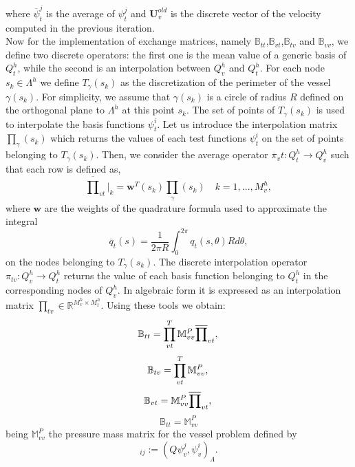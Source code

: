 \documentclass[a4paper]{report}
\begin{document}
where $\overline{\psi}^j_t$ is the average of $\psi^j_t$ and $\mathbf{U}_v^{old}$ is the discrete vector of the velocity computed in the previous iteration.\\
Now for the implementation of exchange matrices, namely $\mathbb{B}_{tt}$,$\mathbb{B}_{vt}$,$\mathbb{B}_{tv}$ and $\mathbb{B}_{vv}$, we define two discrete operators: the first one is the mean value of a generic basis of $Q_t^h$, while the second is an interpolation between $Q_v^h $ and $Q_t^h$. For each node $s_k \in \Lambda^h$  we define $T_\gamma(s_k)$ as the discretization of the perimeter of the vessel $\gamma(s_k)$. For simplicity, we assume that  $\gamma(s_k)$ is a circle of radius $R$ defined on the orthogonal plane to $\Lambda^h$ at this point $s_k$. The set of points of $T_{\gamma}(s_k)$ is used to interpolate the basis functions $\psi^i_t$. Let us introduce the interpolation matrix $\prod_{\gamma}(s_k)$ which returns the values of each test functions $\psi^i_t$ on the set of points belonging to $T_{\gamma}(s_k)$. Then, we consider the average operator $\overline{\pi}_vt: Q^h_t \rightarrow Q^h_v$ such that each row is defined as,
\begin{equation}
\overline{\prod}_{vt}|_k = \mathbf{w}^T(s_k) \prod_{\gamma}(s_k) \quad k=1,..., M^h_v ,
\end{equation}
where $\mathbf{w}$ are the weights of the quadrature formula used to approximate the integral
\begin{equation*}
\overline{q}_t(s)= \frac{1}{2 \pi R}\int^{2 \pi}_0 q_t(s,\theta)R d\theta,
\end{equation*}
on the nodes belonging to $T_{\gamma}(s_k)$. The discrete interpolation operator$\pi_{tv}: Q^h_v \rightarrow Q_t^h$ returns the value of each basis function belonging to $Q^h_t$ in the corresponding nodes of $Q_v^h$. In algebraic form it is expressed as an interpolation matrix $\prod_{tv}\in \mathbb{R}^{M^h_v \times M^h_t}$. Using these tools we obtain:
\begin{equation*}
\mathbb{B}_{tt}= \prod^T_{vt} \mathbb{M}^P_{vv} \overline{\prod}_{vt},\\
\end{equation*}
\begin{equation*}
\mathbb{B}_{tv}= \prod^T_{vt} \mathbb{M}^P_{vv},\\
\end{equation*}
\begin{equation*}
\mathbb{B}_{vt}=  \mathbb{M}^P_{vv} \overline{\prod}_{vt},\\
\end{equation*}
\begin{equation*}
\mathbb{B}_{tt}=  \mathbb{M}^P_{vv} 
\end{equation*}
being $\mathbb{M}^P_{vv}$ the pressure mass matrix for the vessel problem defined by
\begin{equation*}
[\mathbb{M}^P_{vv}]_{ij}:=(Q \psi^j_v, \psi^i_v)_{\Lambda}.
\end{equation*}
\end{document}
